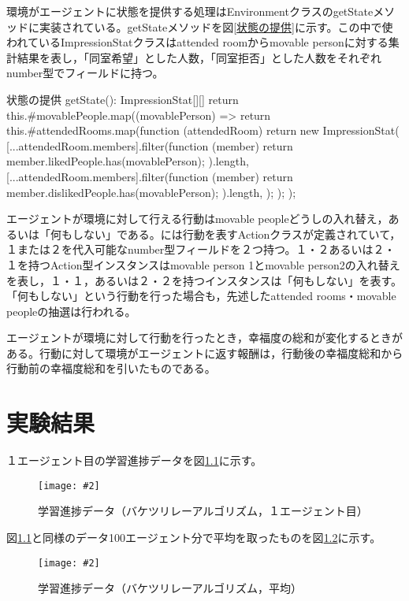 \documentclass[titlepage]{ltjsreport}
\newcommand{\image}[2]{\begin{figure}[h]\vspace{1em}\begin{center}\texttt{[image: \#2]}\caption{#1}\label{#1}\end{center}\end{figure}}
\begin{document}
環境がエージェントに状態を提供する処理はEnvironmentクラスのgetStateメソッドに実装されている。getStateメソッドを図\ref{状態の提供}に示す。この中で使われているImpressionStatクラスはattended roomからmovable personに対する集計結果を表し，「同室希望」とした人数，「同室拒否」とした人数をそれぞれnumber型でフィールドに持つ。
\begin{textbox}{状態の提供}
getState(): ImpressionStat[][] {
	return this.#movablePeople.map((movablePerson) => {
		return this.#attendedRooms.map(function (attendedRoom) {
			return new ImpressionStat(
			[...attendedRoom.members].filter(function (member) {
				return member.likedPeople.has(movablePerson);
			}).length,
			[...attendedRoom.members].filter(function (member) {
				return member.dislikedPeople.has(movablePerson);
			}).length,
			);
		});
	});
}
\end{textbox}

エージェントが環境に対して行える行動はmovable peopleどうしの入れ替え，あるいは「何もしない」である。\cite{環境}には行動を表すActionクラスが定義されていて，１または２を代入可能なnumber型フィールドを２つ持つ。１・２あるいは２・１を持つAction型インスタンスはmovable person 1とmovable person2の入れ替えを表し，１・１，あるいは２・２を持つインスタンスは「何もしない」を表す。「何もしない」という行動を行った場合も，先述したattended rooms・movable peopleの抽選は行われる。

エージェントが環境に対して行動を行ったとき，幸福度の総和が変化するときがある。行動に対して環境がエージェントに返す報酬は，行動後の幸福度総和から行動前の幸福度総和を引いたものである。
\chapter{実験結果}
\label{実験結果}
１エージェント目の学習進捗データを図\ref{学習進捗データ（バケツリレーアルゴリズム，１エージェント目）}に示す。
\image{学習進捗データ（バケツリレーアルゴリズム，１エージェント目）}{外部ファイル/学習進捗データ/バケツリレーアルゴリズム/１エージェント目.png}

図\ref{学習進捗データ（バケツリレーアルゴリズム，１エージェント目）}と同様のデータ100エージェント分で平均を取ったものを図\ref{学習進捗データ（バケツリレーアルゴリズム，平均）}に示す。
\image{学習進捗データ（バケツリレーアルゴリズム，平均）}{外部ファイル/学習進捗データ/バケツリレーアルゴリズム/平均.png}
\end{document}
